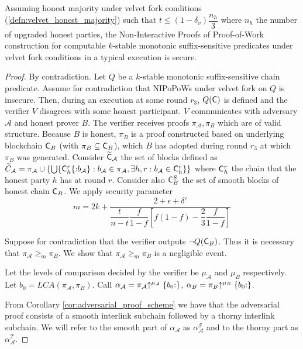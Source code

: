 \begin{theorem}
	Assuming honest majority under velvet fork conditions (\ref{defn:velvet_honest_majority}) such that $t \leq (1 - \delta_v) \dfrac{n_h}{3}$ where $n_h$ the number of upgraded honest parties, the Non-Interactive Proofs of Proof-of-Work construction for computable $k$-stable monotonic suffix-sensitive predicates under velvet fork conditions in a typical execution is secure.
\end{theorem}
\begin{proof}
By contradiction. Let $Q$ be a $k$-stable monotonic suffix-sensitive chain predicate. Assume for contradiction that NIPoPoWs under velvet fork on $Q$ is insecure. Then, during an execution at some round  $r_3$, $Q(\mathsf{C})$ is defined and the verifier $V$ disagrees with some honest participant. $V$ communicates with adversary $\mathcal{A}$ and honest prover $B$. The verifier receives proofs $\pi_\mathcal{A}, \pi_B$ which are of valid structure. Because $B$ is honest, $\pi_B$ is a proof constructed based on underlying blockchain $\mathsf{C}_B$ (with $\pi_B \subseteq \mathsf{C}_B$), which $B$ has adopted during round $r_3$ at which $\pi_B$ was generated. Consider $\widetilde{\mathsf{C}}_\mathcal{A}$ the set of blocks defined as $\widetilde{C}_\mathcal{A} = \pi_\mathcal{A} \cup \{ \bigcup \{\mathsf{C}_h^r\{{:}b_\mathcal{A}\}:  b_\mathcal{A} \in \pi_\mathcal{A}, \exists h,r : b_\mathcal{A} \in \mathsf{C}_{h}^{r}\}  \}$ where $\mathsf{C}_h^r$ the chain that the honest party $h$ has at round $r$. Consider also $\mathsf{C}^S_B$ the set of smooth blocks of honest chain $\mathsf{C}_B$. We apply security parameter 
\begin{equation*}
    m = 2k + \dfrac{2+\epsilon + \delta'}{\dfrac{t}{n-t}\dfrac{f}{1-f}[f(1-f) - \dfrac{2}{3}\dfrac{f}{1-f}]}
\end{equation*}

Suppose for contradiction that the verifier outputs $\neg Q(\mathsf{C}_B)$. Thus it is necessary that $\pi_\mathcal{A} {\geq}_m \pi_B$. We show that $\pi_\mathcal{A} {\geq}_m \pi_B$ is a negligible event.

Let the levels of comparison decided by the verifier be $\mu_\mathcal{A}$ and $\mu_B$ respectively. Let $b_0 = LCA(\pi_\mathcal{A}, \pi_B)$. Call $\alpha_\mathcal{A} = \pi_\mathcal{A} \negthickspace\uparrow^{\mu_\mathcal{A}}\{b_0{:}\}$, $\alpha_B = \pi_B \negthickspace\uparrow^{\mu_B}\{b_0{:}\}$.

From Corollary \ref{cor:adversarial_proof_scheme} we have that the adversarial proof consists of a smooth interlink subchain followed by a thorny interlink subchain. We will refer to the smooth part of $\alpha_\mathcal{A}$ as $\alpha^{\mathcal{S}}_\mathcal{A}$ and to the thorny part as $\alpha^{\mathcal{T}}_\mathcal{A}$.


\end{proof}
